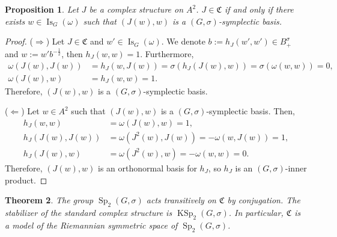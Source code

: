 \documentclass[a4paper,oneside,11pt]{amsart}
\DeclareMathOperator{\Sp}{Sp}
\DeclareMathOperator{\KSp}{KSp}
\DeclareMathOperator{\Is}{Is}
\theoremstyle{plain}
\newtheorem{teo}{Theorem}[section]
\newtheorem{prop}[teo]{Proposition}
\theoremstyle{definition}
\theoremstyle{remark}
\begin{document}
\begin{prop}\label{CompStr-SympBas}
Let $J$ be a complex structure on $A^2$. $J\in\mathfrak C$ if and only if there exists $w\in \Is_G(\omega)$ such that $(J(w),w)$ is a $(G,\sigma)$-symplectic basis.
\end{prop}

\begin{proof}
($\Rightarrow$) Let $J\in\mathfrak C$ and $w'\in\Is_G(\omega)$. We denote $b:=h_J(w',w')\in B^{\sigma}_+$ and $w:=w'b^{-\frac{1}{2}}$, then $h_J(w,w)=1$. Furthermore,
\begin{align*}
    \omega(J(w),J(w))& =h_J(w,J(w)) =\sigma(h_J(J(w),w))=\sigma(\omega(w,w))=0,\\
    \omega(J(w),w)& =h_J(w,w)=1.
\end{align*}
Therefore, $(J(w),w)$ is a $(G,\sigma)$-symplectic basis.

\vspace{2mm}
\noindent ($\Leftarrow$) Let $w\in A^2$ such that $(J(w),w)$ is a $(G,\sigma)$-symplectic basis. Then,
\begin{align*}
    h_J(w,w)& =\omega(J(w),w)=1,\\
    h_J(J(w),J(w))& =\omega(J^2(w),J(w))=-\omega(w,J(w))=1,\\
    h_J(J(w),w)& =\omega(J^2(w),w)=-\omega(w,w)=0.
\end{align*}
Therefore, $(J(w),w)$ is an orthonormal basis for $h_J$, so $h_J$ is an $(G,\sigma)$-inner product.
\end{proof}


\begin{teo}
The group $\Sp_2(G,\sigma)$ acts transitively on $\mathfrak C$ by conjugation. The stabilizer of the standard complex structure is $\KSp_2(G,\sigma)$. In particular, $\mathfrak C$ is a model of the Riemannian symmetric space of $\Sp_2(G,\sigma)$.
\end{teo}
\end{document}
